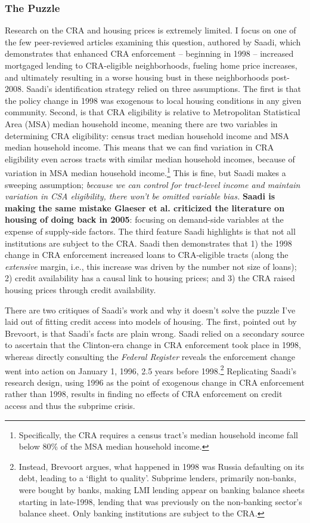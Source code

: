 \documentclass{article}[11pt]
\begin{document}
		\subsubsection{The Puzzle}
Research on the CRA and housing prices is extremely limited. I focus on one of the few peer-reviewed articles examining this question, authored by Saadi, which demonstrates that enhanced CRA enforcement -- beginning in 1998 -- increased mortgaged lending to CRA-eligible neighborhoods, fueling home price increases, and ultimately resulting in a worse housing bust in these neighborhoods post-2008. \citep{saadi2020role} Saadi's identification strategy relied on three assumptions. The first is that the policy change in 1998 was exogenous to local housing conditions in any given community. Second, is that CRA eligibility is relative to Metropolitan Statistical Area (MSA) median household income, meaning there are two variables in determining CRA eligibility: census tract median household income and MSA median household income. This means that we can find variation in CRA eligibility even across tracts with similar median household incomes, because of variation in MSA median household income.\footnote{Specifically, the CRA requires a census tract's median household income fall below 80\% of the MSA median household income.} This is fine, but Saadi makes a sweeping assumption; \textit{because we can control for tract-level income and maintain variation in CSA eligibility, there won't be omitted variable bias.} \textbf{Saadi is making the same mistake Glaeser et al. criticized the literature on housing of doing back in 2005}: focusing on demand-side variables at the expense of supply-side factors. \citep{glaeser2005empirical} The third feature Saadi highlights is that not all institutions are subject to the CRA. Saadi then demonstrates that 1) the 1998 change in CRA enforcement increased loans to CRA-eligible tracts (along the \textit{extensive} margin, i.e., this increase was driven by the number not size of loans); 2) credit availability has a causal link to housing prices; and 3) the CRA raised housing prices through credit availability.

There are two critiques of Saadi's work and why it doesn't solve the puzzle I've laid out of fitting credit access into models of housing. The first, pointed out by Brevoort, is that Saadi's facts are plain wrong. \citep{brevoort2024reexamining} Saadi relied on a secondary source to ascertain that the Clinton-era change in CRA enforcement took place in 1998, whereas directly consulting the \textit{Federal Register} reveals the enforcement change went into action on January 1, 1996, 2.5 years before 1998.\footnote{Instead, Brevoort argues, what happened in 1998 was Russia defaulting on its debt, leading to a `flight to quality'. Subprime lenders, primarily non-banks, were bought by banks, making LMI lending appear on banking balance sheets starting in late-1998, lending that was previously on the non-banking sector's balance sheet. Only banking institutions are subject to the CRA.} Replicating Saadi's research design, using 1996 as the point of exogenous change in CRA enforcement rather than 1998, results in finding no effects of CRA enforcement on credit access and thus the subprime crisis.
\end{document}
